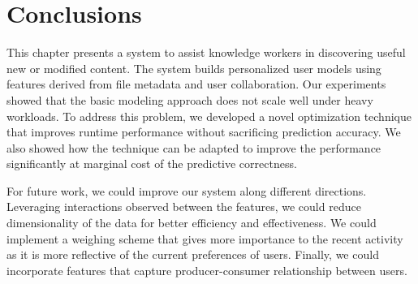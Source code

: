 \section{Conclusions}
\label{sec:conclusion}

This chapter presents a system to assist knowledge workers in
discovering useful new or modified content.  The system builds
personalized user models using features derived from file metadata and
user collaboration.  Our experiments showed that the basic modeling
approach does not scale well under heavy workloads. To address this
problem, we developed a novel optimization technique that improves
runtime performance without sacrificing prediction accuracy.  We also
showed how the technique can be adapted to improve the performance
significantly at marginal cost of the predictive correctness.

For future work, we could improve our system along different
directions.  Leveraging interactions observed between the features, we
could reduce dimensionality of the data for better efficiency and
effectiveness.  We could implement a weighing scheme that gives more
importance to the recent activity as it is more reflective of the
current preferences of users.  Finally, we could incorporate features
that capture producer-consumer relationship between users.


